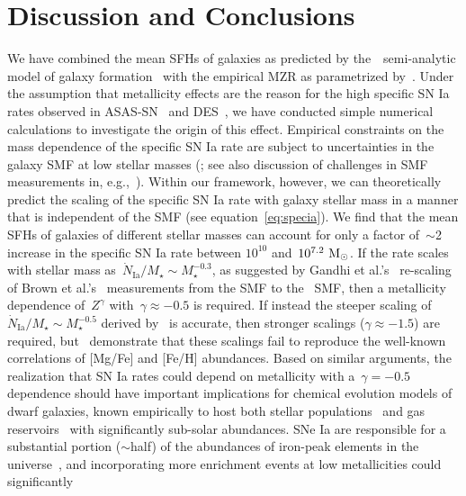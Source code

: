 \documentclass[ms.tex]{subfiles}
\begin{document}
\section{Discussion and Conclusions}
\label{sec:conclusions}

We have combined the mean SFHs of galaxies as predicted by the~\um~semi-analytic
model of galaxy formation~\citep{Behroozi2019} with the empirical MZR as
parametrized by~\citet{Zahid2014}.
Under the assumption that metallicity effects are the reason for the high
specific SN Ia rates observed in ASAS-SN~\citep{Brown2019, Gandhi2022} and
DES~\citep{Wiseman2021}, we have conducted simple numerical calculations to
investigate the origin of this effect.
Empirical constraints on the mass dependence of the specific SN Ia rate are
subject to uncertainties in the galaxy SMF at low stellar masses
(\citealp{Gandhi2022}; see also discussion of challenges in SMF measurements
in, e.g.,~\citealp{Weigel2016}).
Within our framework, however, we can theoretically predict the scaling of the
specific SN Ia rate with galaxy stellar mass in a manner that is independent of
the SMF (see equation~\ref{eq:specia}).
We find that the mean SFHs of galaxies of different stellar masses can account
for only a factor of~$\sim$2 increase in the specific SN Ia rate between
$10^{10}$ and~$10^{7.2}~\text{M}_\odot$.
If the rate scales with stellar mass as~$\dot{N}_\text{Ia} / M_\star \sim
M_\star^{-0.3}$, as suggested by Gandhi et al.'s~\citeyearpar{Gandhi2022}
re-scaling of Brown et al.'s~\citeyearpar{Brown2019} measurements from the
\citet{Bell2003} SMF to the~\citet{Baldry2012} SMF, then a metallicity
dependence of~$Z^\gamma$ with~$\gamma \approx -0.5$ is required.
If instead the steeper scaling of~$\dot{N}_\text{Ia} / M_\star \sim
M_\star^{-0.5}$ derived by~\citet{Brown2019} is accurate, then stronger
scalings ($\gamma \approx -1.5$) are required, but~\citet{Gandhi2022}
demonstrate that these scalings fail to reproduce the well-known correlations
of [Mg/Fe] and [Fe/H] abundances.
Based on similar arguments, the realization that SN Ia rates could depend on
metallicity with a~$\gamma = -0.5$ dependence should have important
implications for chemical evolution models of dwarf galaxies, known empirically
to host both stellar populations~\citep{Gallazzi2005, Kirby2013} and gas
reservoirs~\citep{Tremonti2004, Zahid2011, Andrews2013, Zahid2014} with
significantly sub-solar abundances.
SNe Ia are responsible for a substantial portion ($\sim$half) of the abundances
of iron-peak elements in the universe~\citep[e.g.][]{Johnson2019}, and
incorporating more enrichment events at low metallicities could significantly
\end{document}
